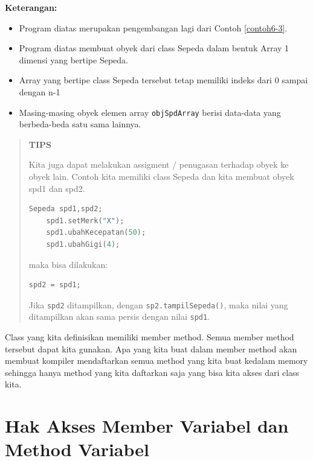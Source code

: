 \textbf{Keterangan:}

\begin{itemize}

\item
 Program diatas merupakan pengembangan lagi dari Contoh \ref{contoh6-3}.
\item
 Program diatas membuat obyek dari class Sepeda dalam bentuk Array 1
 dimensi yang bertipe Sepeda.
\item
 Array yang bertipe class Sepeda tersebut tetap memiliki indeks dari 0
 sampai dengan n-1
\item
 Masing-masing obyek elemen array \texttt{objSpdArray} berisi data-data
 yang berbeda-beda satu sama lainnya.
\end{itemize}

\begin{quotation}
{\LARGE {}} \textbf{TIPS}

	Kita juga
	dapat melakukan assigment / penugasan terhadap obyek ke obyek lain.
	Contoh kita memiliki class Sepeda dan kita membuat obyek spd1 dan spd2.

	\begin{lstlisting}[language=c++, numbers=none]
	Sepeda spd1,spd2;
	spd1.setMerk("X");
	spd1.ubahKecepatan(50);
	spd1.ubahGigi(4);
	\end{lstlisting}

	maka bisa dilakukan:

	\begin{lstlisting}[language=c++, numbers=none]
	spd2 = spd1;
	\end{lstlisting}

	Jika \texttt{spd2} ditampilkan, dengan \texttt{sp2.tampilSepeda()}, maka
	nilai yang ditampilkan akan sama persis dengan nilai \texttt{spd1}.
\end{quotation}


Class yang kita definisikan memiliki member method. Semua member method
tersebut dapat kita gunakan. Apa yang kita buat dalam member method akan
membuat kompiler mendaftarkan semua method yang kita buat kedalam memory
sehingga hanya method yang kita daftarkan saja yang bisa kita akses dari
class kita.

\section{Hak Akses Member Variabel dan Method
Variabel}\label{hak-akses-member-variabel-dan-method-variabel}

